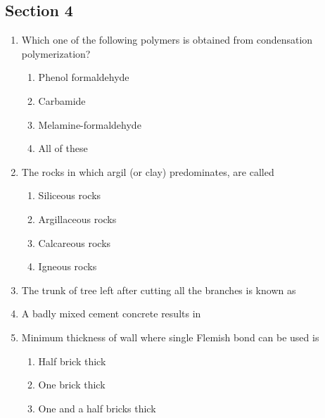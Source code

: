 \documentclass[11pt,a4paper]{article}
\begin{document}
\subsection*{Section 4}
\begin{enumerate}
\item{Which one of the following polymers is obtained from condensation polymerization?}
\begin{enumerate}[label=\Alph*.]
\item{Phenol formaldehyde}
\item{Carbamide}
\item{Melamine-formaldehyde}
\item{All of these}
\end{enumerate}
\item{The rocks in which argil (or clay) predominates, are called}
\begin{enumerate}[label=\Alph*.]
\item{Siliceous rocks}
\item{Argillaceous rocks}
\item{Calcareous rocks}
\item{Igneous rocks}
\end{enumerate}
\item{The trunk of tree left after cutting all the branches is known as}
\\
\item{A badly mixed cement concrete results in}
\\
\item{Minimum thickness of wall where single Flemish bond can be used is}
\begin{enumerate}[label=\Alph*.]
\item{Half brick thick}
\item{One brick thick}
\item{One and a half bricks thick}

\end{enumerate}
\end{enumerate}
\end{document}
